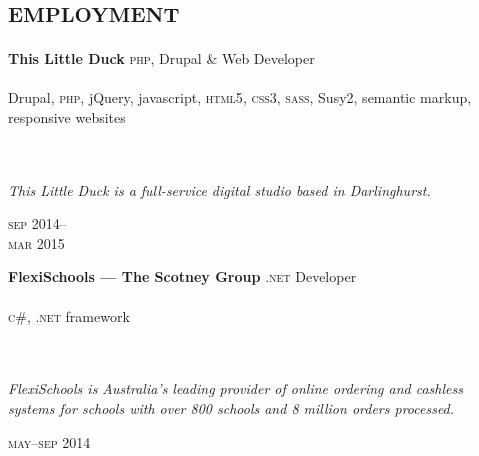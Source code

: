 
\vspace{-0.6cm}
\section*{\textsc{employment}}
\vspace{-0.2cm}

\begin{minipage}[t]{0.60\textwidth}
\textbf{This Little Duck}\phantom{..} \textsc{php}, Drupal \& Web Developer \\
\\
Drupal, \textsc{php}, jQuery, javascript, \textsc{html5}, 
\textsc{css3}, \textsc{sass}, Susy2, semantic markup, responsive websites
\\
\\
\\
{\small
\textit{This Little Duck is a full-service digital studio based in Darlinghurst.}
\par}
\end{minipage}
\begin{minipage}[t]{0.40\textwidth}
{
\hfill \textsc{sep} 2014--\\ 
\hspace*{0pt} \hfill \textsc{mar} 2015
\par
}
\end{minipage}

\vspace{0.2in}

\begin{minipage}[t]{0.7\textwidth}
\textbf{FlexiSchools --- The Scotney Group}\phantom{..} \textsc{.net} Developer \\
\\
\textsc{c\#}, \textsc{.net} framework
\\
\\
\\
{\small
\textit{FlexiSchools is Australia’s leading provider of online ordering and cashless systems for schools with over 800 schools and 8 million orders processed. }
\par}
\end{minipage}
\begin{minipage}[t]{0.30\textwidth}
\hfill \textsc{may}--\textsc{sep} 2014\\
\end{minipage}

\vspace{0.2in}


